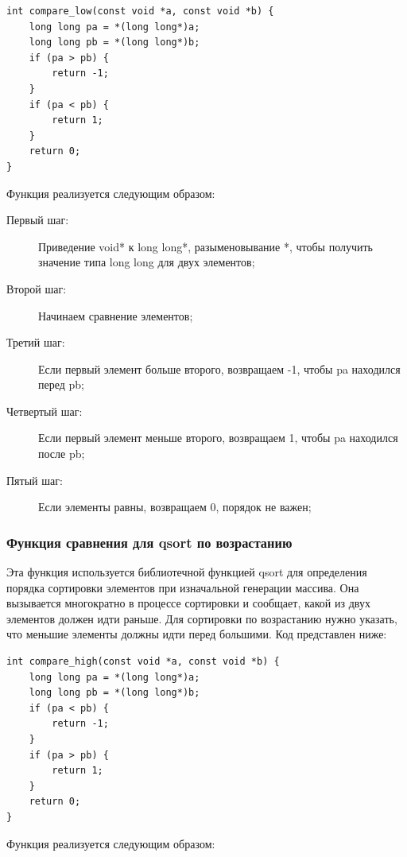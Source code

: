 \documentclass[a4paper,12pt,titlepage,finall]{article}
\begin{document}
\begin{verbatim}
int compare_low(const void *a, const void *b) {
    long long pa = *(long long*)a;
    long long pb = *(long long*)b;
    if (pa > pb) {
        return -1;
    } 
    if (pa < pb) {
        return 1;
    } 
    return 0;
}
\end{verbatim}

Функция реализуется следующим образом:

\begin{description}
\item[Первый шаг:] Приведение void* к long long*, разыменовывание *, чтобы получить значение типа long long для двух элементов;

\item[Второй шаг:] Начинаем сравнение элементов;

\item[Третий шаг:] Если первый элемент больше второго, возвращаем -1, чтобы pa находился перед pb;

\item[Четвертый шаг:] Если первый элемент меньше второго, возвращаем 1, чтобы pa находился после pb;

\item[Пятый шаг:] Если элементы равны, возвращаем 0, порядок не важен;
\end{description}


\subsubsection{Функция сравнения для qsort по возрастанию}
Эта функция используется библиотечной функцией qsort для определения порядка сортировки элементов при изначальной генерации массива. Она вызывается многократно в процессе сортировки и сообщает, какой из двух элементов должен идти раньше. Для сортировки по возрастанию нужно указать, что меньшие элементы должны идти перед большими.
Код представлен ниже:

\begin{verbatim}
int compare_high(const void *a, const void *b) {
    long long pa = *(long long*)a;
    long long pb = *(long long*)b;
    if (pa < pb) {
        return -1;
    }
    if (pa > pb) {
        return 1;
    }
    return 0;
}
\end{verbatim}

Функция реализуется следующим образом:
\end{document}
